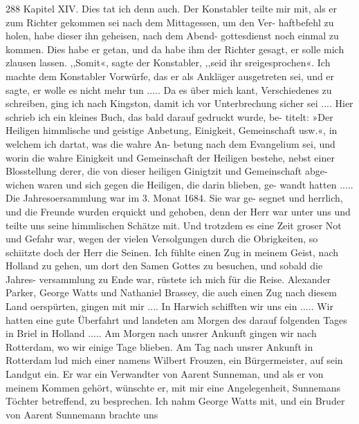 288 Kapitel XIV.
Dies tat ich denn auch. Der Konstabler teilte mir mit, als er
zum Richter gekommen sei nach dem Mittagessen, um den Ver-
haftbefehl zu holen, habe dieser ihn geheisen, nach dem Abend-
gottesdienst noch einmal zu kommen. Dies habe er getan, und da
habe ihm der Richter gesagt, er solle mich zlausen lassen. ,,Somit«,
sagte der Konstabler, ,,seid ihr sreigesprochen«. Ich machte dem
Konstabler Vorwürfe, das er als Ankläger ausgetreten sei, und
er sagte, er wolle es nicht mehr tun .....
Da es über mich kant, Verschiedenes zu schreiben, ging ich
nach Kingston, damit ich vor Unterbrechung sicher sei .... Hier
schrieb ich ein kleines Buch, das bald darauf gedruckt wurde, be-
titelt: »Der Heiligen himmlische und geistige Anbetung, Einigkeit,
Gemeinschaft usw.«, in welchem ich dartat, was die wahre An-
betung nach dem Evangelium sei, und worin die wahre Einigkeit
und Gemeinschaft der Heiligen bestehe, nebst einer Blosstellung
derer, die von dieser heiligen Ginigtzit und Gemeinschaft abge-
wichen waren und sich gegen die Heiligen, die darin blieben, ge-
wandt hatten .....
Die Jahresoersammlung war im 3. Monat 1684. Sie war ge-
segnet und herrlich, und die Freunde wurden erquickt und gehoben,
denn der Herr war unter uns und teilte uns seine himmlischen
Schätze mit. Und trotzdem es eine Zeit groser Not und Gefahr
war, wegen der vielen Versolgungen durch die Obrigkeiten, so
schiitzte doch der Herr die Seinen.
Ich fühlte einen Zug in meinem Geist, nach Holland zu gehen,
um dort den Samen Gottes zu besuchen, und sobald die Jahres-
versammlung zu Ende war, rüstete ich mich für die Reise.
Alexander Parker, George Watts und Nathaniel Brassey, die
auch einen Zug nach diesem Land oerspürten, gingen mit mir ....
In Harwich schifften wir uns ein ..... Wir hatten eine gute
Überfahrt und landeten am Morgen des darauf folgenden Tages
in Briel in Holland ..... Am Morgen nach unsrer Ankunft
gingen wir nach Rotterdam, wo wir einige Tage blieben. Am
Tag nach unsrer Ankunft in Rotterdam lud mich einer namens
Wilbert Frouzen, ein Bürgermeister, auf sein Landgut ein. Er
war ein Verwandter von Aarent Sunneman, und als er von
meinem Kommen gehört, wünschte er, mit mir eine Angelegenheit,
Sunnemans Töchter betreffend, zu besprechen. Ich nahm George
Watts mit, und ein Bruder von Aarent Sunnemann brachte uns


